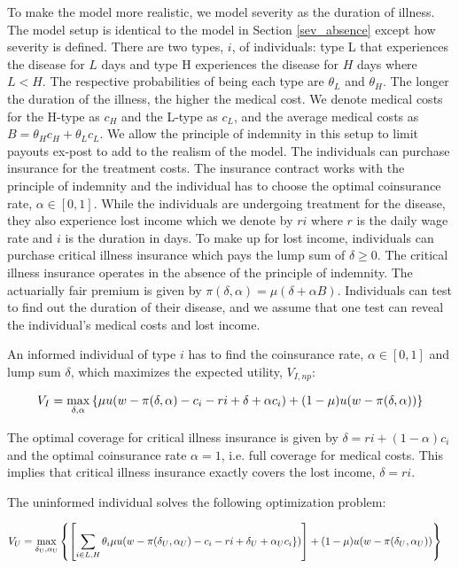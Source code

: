 \documentclass[natbib=false,preprint,12pt]{elsarticle}
\theoremstyle{plain}
\theoremstyle{definition}
\theoremstyle{plain}
\theoremstyle{TheoremNum}
\theoremstyle{CorollaryNum}
\theoremstyle{PropositionNum}
\theoremstyle{TheoremNum}
\begin{document}
To make the model more realistic, we model severity as the duration of illness. The model setup is identical to the model in Section \ref{sev_absence} except how severity is defined. There are two types, $i$, of individuals: type L that experiences the disease for $L$ days and type H experiences the disease for $H$ days where $L<H$. The respective probabilities of being each type are $\theta_L$ and $\theta_H$. The longer the duration of the illness, the higher the medical cost. We denote medical costs for the H-type as $c_H$ and the L-type as $c_L$, and the average medical costs as $B = \theta_H c_H + \theta_L c_L$. We allow the principle of indemnity in this setup to limit payouts ex-post to add to the realism of the model. The individuals can purchase insurance for the treatment costs. The insurance contract works with the principle of indemnity and the individual has to choose the optimal coinsurance rate, $\alpha \in [0,1]$. While the individuals are undergoing treatment for the disease, they also experience lost income which we denote by $ri$ where $r$ is the daily wage rate and $i$ is the duration in days. To make up for lost income, individuals can purchase critical illness insurance which pays the lump sum of $\delta \geq 0$. The critical illness insurance operates in the absence of the principle of indemnity. The actuarially fair premium is given by $\pi(\delta,\alpha) = \mu(\delta + \alpha B)$. Individuals can test to find out the duration of their disease, and we assume that one test can reveal the individual's medical costs and lost income.  

An informed individual of type $i$ has to find the coinsurance rate, $\alpha \in [0,1]$ and lump sum $\delta$, which maximizes the expected utility, $V_{I,np}$:

\begin{align}
    V_{I} = \underset{\rm \delta, \alpha}{\rm max} \left\{\mu u(w-\pi(\delta, \alpha)-c_i-ri+\delta + \alpha c_i )+(1-\mu)u(w-\pi(\delta,\alpha))\right\}
\label{informed_combined_maxproblem}
\end{align}

The optimal coverage for critical illness insurance is given by $\delta = ri + (1-\alpha)c_i$ and the optimal coinsurance rate $\alpha =1$, i.e. full coverage for medical costs. This implies that critical illness insurance exactly covers the lost income, $\delta = ri$. 

The uninformed individual solves the following optimization problem:

\begin{align}
V_{U} = \underset{\rm \delta_U, \alpha_U}{\rm max } & \left\{\left[\sum_{i \in {L,H}} \theta_i \mu u(w-\pi(\delta_U,\alpha_U)-c_i- ri+\delta_U + \alpha_U c_i\})\right] + (1-\mu)u(w-\pi(\delta_U,\alpha_U))\right\}
\label{uninformed_combined_maxproblem}
\end{align}
\end{document}
